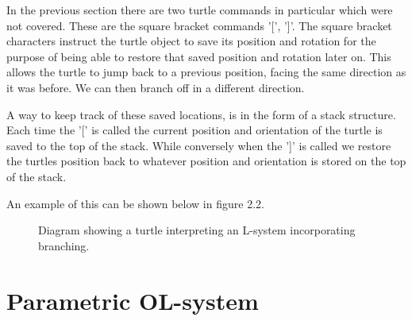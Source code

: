 \begin{flushleft}

In the previous section there are two turtle commands in particular which were  not covered. These are the square bracket commands '[', ']'. The square bracket characters instruct the turtle object to save its position and rotation for the purpose of being able to restore that saved position and rotation later on. This allows the turtle to jump back to a previous position, facing the same direction as it was before. We can then branch off in a different direction.\\

\vspace{5mm}

A way to keep track of these saved locations, is in the form of a stack structure. Each time the '[' is called the current position and orientation of the turtle is saved to the top of the stack. While conversely when the ']' is called we restore the turtles position back to whatever position and orientation is stored on the top of the stack. \\

\vspace{5mm}

An example of this can be shown below in figure 2.2.\\

\begin{figure}[htbp]
	{\centering
		\setlength{\fboxrule}{1pt}
		\vspace{7px}
		\caption{Diagram showing a turtle interpreting an L-system incorporating branching.}
	}
\end{figure}
\FloatBarrier

\end{flushleft}

\section{Parametric OL-system} \label{parametric}

